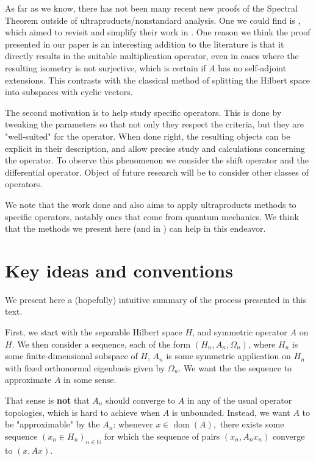 \documentclass[10pt,a4paper]{amsart}
\def \Dom{\operatorname{dom}}
\begin{document}
As far as we know, there has not been many recent new proofs of the Spectral Theorem outside of ultraproducts/nonstandard analysis. One we could find is \cite{leinfelder2017secondlookageometric}, which aimed to revisit and simplify their work in \cite{leinfelder1979geometric}. One reason we think the proof presented in our paper is an interesting addition to the literature is that it directly results in the suitable multiplication operator, even in cases where the resulting isometry is not surjective, which is certain if $A$ has no self-adjoint extensions. This contrasts with the classical method of splitting the Hilbert space into subspaces with cyclic vectors.

The second motivation is to help study specific operators. This is done by tweaking the parameters so that not only they respect the criteria, but they are "well-suited" for the operator. When done right, the resulting objects can be explicit in their description, and allow precise study and calculations concerning the operator. To observe this phenomenon we consider the shift operator and the differential operator. Object of future research will be to consider other classes of operators. 

We note that the work done \cite{HIRVONEN_HYTTINEN_2024} and \cite{hyttinen2024approximationsfeynmanpathintegrals} also aims to apply ultraproducts methods to specific operators, notably ones that come from quantum mechanics. We think that the methods we present here (and in \cite{nonez2024spectralequivalencesnonstandardsamplings}) can help in this endeavor. 
\section{Key ideas and conventions}\label{section_idea}

We present here a (hopefully) intuitive summary of the process presented in this text.

First, we start with the separable Hilbert space $H$, and symmetric operator $A$ on $H$. We then consider a sequence, each of the form $(H_n, A_n, \Omega_n)$, where $H_n$ is some finite-dimensional subspace of $H$, $A_n$ is some symmetric application on $H_n$ with fixed orthonormal eigenbasis given by $\Omega_n.$ We want the the sequence to approximate $A$ in some sense. 

That sense is \textbf{not} that $A_n$ should converge to $A$  in any of the usual operator topologies, which is hard to achieve when $A$ is unbounded. Instead, we want $A$ to be "approximable" by the $A_n$: whenever $x\in\Dom(A),$ there exists some sequence $(x_n\in H_n)_{n\in\mathbb{N}}$ for which the sequence of pairs $(x_n, A_n x_n)$ converge to $(x,Ax)$.
\end{document}
